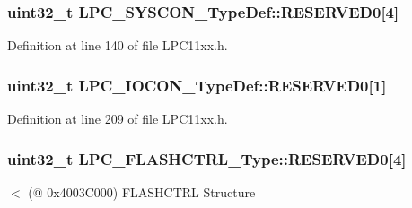 \subsubsection[{\texorpdfstring{R\+E\+S\+E\+R\+V\+E\+D0}{RESERVED0}}]{\setlength{\rightskip}{0pt plus 5cm}uint32\+\_\+t L\+P\+C\+\_\+\+S\+Y\+S\+C\+O\+N\+\_\+\+Type\+Def\+::\+R\+E\+S\+E\+R\+V\+E\+D0\mbox{[}4\mbox{]}}\hypertarget{group___l_p_c11xx___definitions_ga3b1f45f981b0b5c60a243403b3c158b9}{}\label{group___l_p_c11xx___definitions_ga3b1f45f981b0b5c60a243403b3c158b9}


Definition at line 140 of file L\+P\+C11xx.\+h.

\subsubsection[{\texorpdfstring{R\+E\+S\+E\+R\+V\+E\+D0}{RESERVED0}}]{\setlength{\rightskip}{0pt plus 5cm}uint32\+\_\+t L\+P\+C\+\_\+\+I\+O\+C\+O\+N\+\_\+\+Type\+Def\+::\+R\+E\+S\+E\+R\+V\+E\+D0\mbox{[}1\mbox{]}}\hypertarget{group___l_p_c11xx___definitions_gae0c9ad1b3c2f523a2ae17423b3e14f39}{}\label{group___l_p_c11xx___definitions_gae0c9ad1b3c2f523a2ae17423b3e14f39}


Definition at line 209 of file L\+P\+C11xx.\+h.

\subsubsection[{\texorpdfstring{R\+E\+S\+E\+R\+V\+E\+D0}{RESERVED0}}]{ uint32\+\_\+t L\+P\+C\+\_\+\+F\+L\+A\+S\+H\+C\+T\+R\+L\+\_\+\+Type\+::\+R\+E\+S\+E\+R\+V\+E\+D0\mbox{[}4\mbox{]}}\hypertarget{group___l_p_c11xx___definitions_ga1e76ff992a53b6f0d322ba31ceed23a1}{}\label{group___l_p_c11xx___definitions_ga1e76ff992a53b6f0d322ba31ceed23a1}
$<$ (@ 0x4003\+C000) F\+L\+A\+S\+H\+C\+T\+RL Structure 

